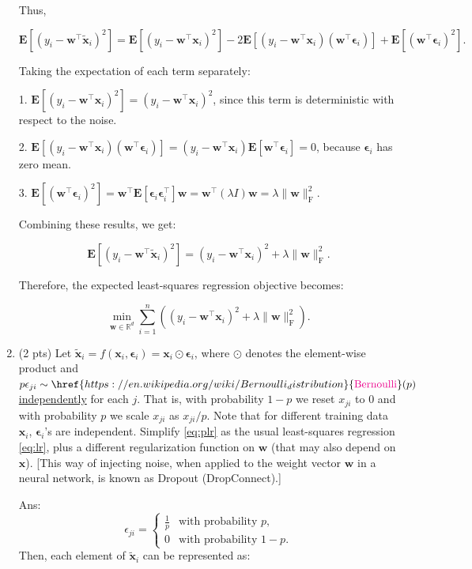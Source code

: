 \documentclass[10pt]{article}
\newcommand{\wv}{\mathbf{w}}
\newcommand{\xv}{\mathbf{x}}
\newcommand{\RR}{\mathds{R}}
\newcommand{\epsilonv}{\boldsymbol{\epsilon}}
\newcommand{\ans}[1]{{\color{blue}\textsf{Ans}: #1}}
\newcommand{\magenta}[1]{{\color{magenta}#1}}
\begin{document}
\begin{exercise}
\begin{enumerate}
		      Thus,

		      $$
			      \mathbf{E}[(y_i - \wv^\top \tilde{\xv}_i)^2] = \mathbf{E}[(y_i - \wv^\top \xv_i)^2] - 2\mathbf{E}[(y_i - \wv^\top \xv_i)(\wv^\top \epsilonv_i)]+\mathbf{E}[(\wv^\top \epsilonv_i)^2].
		      $$

		      Taking the expectation of each term separately:

		      1. $\mathbf{E}[(y_i - \wv^\top \xv_i)^2] = (y_i - \wv^\top \xv_i)^2$, since this term is deterministic with respect to the noise.

		      2. $\mathbf{E}[(y_i - \wv^\top \xv_i)(\wv^\top \epsilonv_i)] = (y_i - \wv^\top \xv_i) \mathbf{E}[\wv^\top \epsilonv_i] = 0$, because $\epsilonv_i$ has zero mean.

		      3. $\mathbf{E}[(\wv^\top \epsilonv_i)^2] = \wv^\top \mathbf{E}[\epsilonv_i \epsilonv_i^\top] \wv = \wv^\top (\lambda I) \wv = \lambda \|\wv\|^2_\mathrm{F}$.

		      Combining these results, we get:

		      $$
			      \mathbf{E}[(y_i - \wv^\top \tilde{\xv}_i)^2] = (y_i - \wv^\top \xv_i)^2 + \lambda \|\wv\|^2_\mathrm{F}.
		      $$

		      Therefore, the expected least-squares regression objective becomes:

		      $$
			      \boxed{\min_{\wv \in \RR^d} \sum_{i=1}^n \left( (y_i - \wv^\top \xv_i)^2 + \lambda \|\wv\|^2_\mathrm{F} \right)}.
		      $$

		      \newpage
		\item (2 pts) Let $\tilde{\xv}_i = f(\xv_i, \epsilonv_i) = \xv_i \odot \epsilonv_i$, where $\odot$ denotes the element-wise product and $p \epsilon_{ji} \sim \href{https://en.wikipedia.org/wiki/Bernoulli_distribution}{\magenta{\mathrm{Bernoulli}}}(p)$ \href{https://en.wikipedia.org/wiki/Independence_(probability_theory)}{\magenta{independently}} for each $j$. That is, with probability $1-p$ we reset $x_{ji} $ to 0 and with probability $p$ we scale $x_{ji}$ as $x_{ji}/p$. Note that for different training data $\xv_i$, $\epsilonv_i$'s are independent. Simplify \eqref{eq:plr} as the usual least-squares regression \eqref{eq:lr}, plus a different regularization function on $\wv$ (that may also depend on $\xv$). [This way of injecting noise, when applied to the weight vector $\wv$ in a neural network, is known as Dropout (DropConnect).]

		      \ans\\
		      $$
			      \epsilon_{ji} =
			      \begin{cases}
				      \frac{1}{p} & \text{with probability } p,   \\
				      0           & \text{with probability } 1-p.
			      \end{cases}
		      $$
		      Then, each element of $\tilde{\xv}_i$ can be represented as:


\end{enumerate}
\end{exercise}
\end{document}

